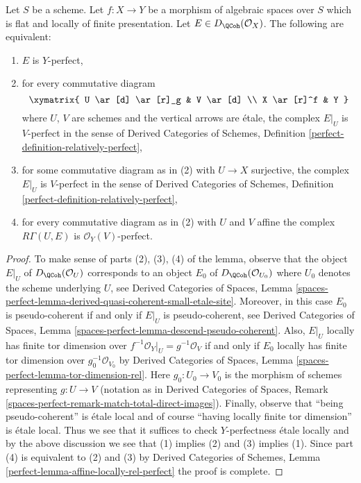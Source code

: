 \begin{lemma}
\label{lemma-affine-locally-rel-perfect}
Let $S$ be a scheme. Let $f : X \to Y$ be a morphism of algebraic spaces
over $S$ which is flat and locally of finite presentation.
Let $E \in D_\QCoh(\mathcal{O}_X)$. The following are equivalent:
\begin{enumerate}
\item $E$ is $Y$-perfect,
\item for every commutative diagram
$$
\xymatrix{
U \ar[d] \ar[r]_g & V \ar[d] \\
X \ar[r]^f & Y
}
$$
where $U$, $V$ are schemes and the vertical arrows are \'etale, the complex
$E|_U$ is $V$-perfect in the sense of Derived Categories of Schemes,
Definition \ref{perfect-definition-relatively-perfect},
\item for some commutative diagram as in (2) with $U \to X$
surjective, the complex $E|_U$ is $V$-perfect in the sense of
Derived Categories of Schemes,
Definition \ref{perfect-definition-relatively-perfect},
\item for every commutative diagram as in (2) with $U$ and $V$
affine the complex $R\Gamma(U, E)$ is $\mathcal{O}_Y(V)$-perfect.
\end{enumerate}
\end{lemma}

\begin{proof}
To make sense of parts (2), (3), (4) of the lemma, observe that
the object $E|_U$ of $D_\QCoh(\mathcal{O}_U)$ corresponds to
an object $E_0$ of $D_\QCoh(\mathcal{O}_{U_0})$ where $U_0$
denotes the scheme underlying $U$, see Derived Categories of Spaces,
Lemma \ref{spaces-perfect-lemma-derived-quasi-coherent-small-etale-site}.
Moreover, in this case $E_0$ is pseudo-coherent if and only if
$E|_U$ is pseudo-coherent, see Derived Categories of Spaces,
Lemma \ref{spaces-perfect-lemma-descend-pseudo-coherent}.
Also, $E|_U$ locally has finite tor dimension over
$f^{-1}\mathcal{O}_Y|_U = g^{-1}\mathcal{O}_V$ if and only if
$E_0$ locally has finite tor dimension over $g_0^{-1}\mathcal{O}_{V_0}$
by Derived Categories of Spaces, Lemma
\ref{spaces-perfect-lemma-tor-dimension-rel}.
Here $g_0 : U_0 \to V_0$ is the morphism of schemes representing
$g : U \to V$ (notation as in Derived Categories of Spaces,
Remark \ref{spaces-perfect-remark-match-total-direct-images}).
Finally, observe that ``being pseudo-coherent'' is \'etale local and
of course ``having locally finite tor dimension'' is \'etale local.
Thus we see that it suffices to check $Y$-perfectness \'etale locally
and by the above discussion we see that (1) implies (2) and
(3) implies (1). Since part (4) is equivalent
to (2) and (3) by
Derived Categories of Schemes, Lemma
\ref{perfect-lemma-affine-locally-rel-perfect}
the proof is complete.
\end{proof}








